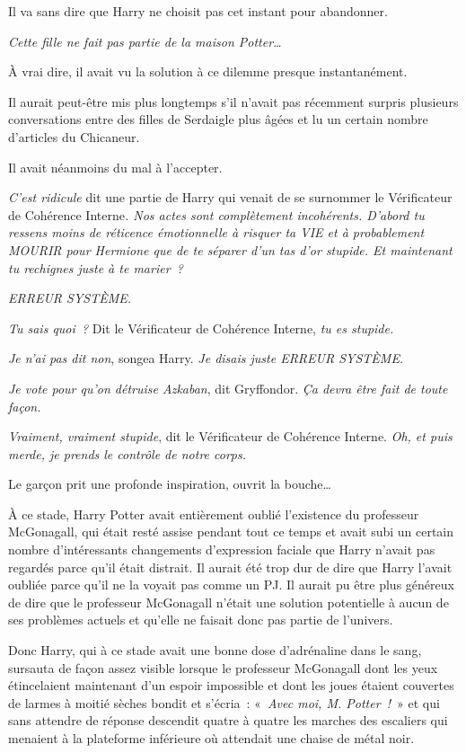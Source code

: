 Il va sans dire que Harry ne choisit pas cet instant pour abandonner.

\emph{Cette fille ne fait pas partie de la maison Potter…}

À vrai dire, il avait vu la solution à ce dilemme presque instantanément.

Il aurait peut-être mis plus longtemps s'il n'avait pas récemment surpris plusieurs conversations entre des filles de Serdaigle plus âgées et lu un certain nombre d'articles du Chicaneur.

Il avait néanmoins du mal à l'accepter.

\emph{C'est ridicule} dit une partie de Harry qui venait de se surnommer le Vérificateur de Cohérence Interne\emph{.
Nos actes sont complètement incohérents.
D'abord tu ressens moins de réticence émotionnelle à risquer ta VIE et à probablement MOURIR pour Hermione que de te séparer d'un tas d'or stupide.
Et maintenant tu rechignes juste à te marier~?}

\emph{ERREUR SYSTÈME.}

\emph{Tu sais quoi~?} Dit le Vérificateur de Cohérence Interne, \emph{tu es stupide.}

\emph{Je n'ai pas dit non}, songea Harry.
\emph{Je disais juste ERREUR SYSTÈME.}

\emph{Je vote pour qu'on détruise Azkaban}, dit Gryffondor.
\emph{Ça devra être fait de toute façon.}

\emph{Vraiment, vraiment stupide}, dit le Vérificateur de Cohérence Interne.
\emph{Oh, et puis merde, je prends le contrôle de notre corps.}

Le garçon prit une profonde inspiration, ouvrit la bouche…

À ce stade, Harry Potter avait entièrement oublié l'existence du professeur McGonagall, qui était resté assise pendant tout ce temps et avait subi un certain nombre d'intéressants changements d'expression faciale que Harry n'avait pas regardés parce qu'il était distrait.
Il aurait été trop dur de dire que Harry l'avait oubliée parce qu'il ne la voyait pas comme un PJ.
Il aurait pu être plus généreux de dire que le professeur McGonagall n'était une solution potentielle à aucun de ses problèmes actuels et qu'elle ne faisait donc pas partie de l'univers.

Donc Harry, qui à ce stade avait une bonne dose d'adrénaline dans le sang, sursauta de façon assez visible lorsque le professeur McGonagall dont les yeux étincelaient maintenant d'un espoir impossible et dont les joues étaient couvertes de larmes à moitié sèches bondit et s'écria~: «~\emph{Avec moi, M. Potter~!}~» et qui sans attendre de réponse descendit quatre à quatre les marches des escaliers qui menaient à la plateforme inférieure où attendait une chaise de métal noir.

